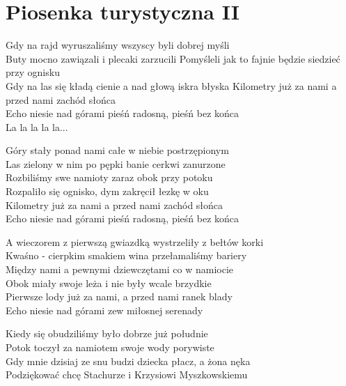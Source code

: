 \section{Piosenka turystyczna II}
\begin{text}
    \small{
Gdy na rajd wyruszaliśmy wszyscy byli dobrej myśli\\
Buty mocno zawiązali i plecaki zarzucili
Pomyśleli jak to fajnie będzie siedzieć przy ognisku\\
Gdy na las się kładą cienie a nad głową iskra błyska
Kilometry już za nami a przed nami zachód słońca\\
Echo niesie nad górami pieśń radosną, pieśń bez końca\\
La la la la la...

Góry stały ponad nami całe w niebie postrzępionym\\
Las zielony w nim po pępki banie cerkwi zanurzone\\
Rozbiliśmy swe namioty zaraz obok przy potoku\\
Rozpaliło się ognisko, dym zakręcił łezkę w oku\\
Kilometry już za nami a przed nami zachód słońca\\
Echo niesie nad górami pieśń radosną, pieśń bez końca

A wieczorem z pierwszą gwiazdką wystrzeliły z bełtów korki\\
Kwaśno - cierpkim smakiem wina przełamaliśmy bariery\\
Między nami a pewnymi dziewczętami co w namiocie\\
Obok miały swoje leża i nie były wcale brzydkie\\
Pierwsze lody już za nami, a przed nami ranek blady\\
Echo niesie nad górami zew miłosnej serenady

Kiedy się obudziliśmy było dobrze już południe\\
Potok toczył za namiotem swoje wody porywiste\\
Gdy mnie dzisiaj ze snu budzi dziecka płacz, a żona nęka\\
Podziękować chcę Stachurze i Krzysiowi Myszkowskiemu\\
    }
\end{text}